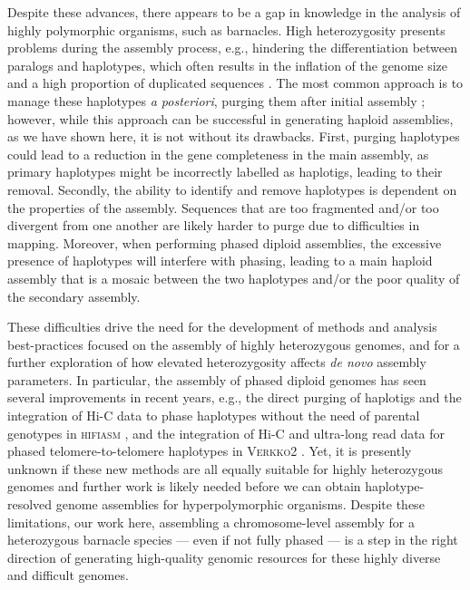 \documentclass[11pt]{article}
\begin{document}
Despite these advances, there appears to be a gap in knowledge in the analysis of
highly polymorphic organisms, such as barnacles. High heterozygosity presents
problems during the assembly process, e.g., hindering the differentiation between
paralogs and haplotypes, which often results in the inflation of the genome size and
a high proportion of duplicated sequences \citep{guiglielmoni_phasing_2024,
asalone_regional_2020,roach_purge_2018,mochizuki_practical_2023}. The most common
approach is to manage these haplotypes \textit{a posteriori}, purging them after
initial assembly \citep{guan_identifying_2020,roach_purge_2018}; however, while this
approach can be successful in generating haploid assemblies, as we have shown here,
it is not without its drawbacks. First, purging haplotypes could lead to a reduction
in the gene completeness in the main assembly, as primary haplotypes might be
incorrectly labelled as haplotigs, leading to their removal. Secondly, the ability
to identify and remove haplotypes is dependent on the properties of the assembly.
Sequences that are too fragmented and/or too divergent from one another are likely
harder to purge due to difficulties in mapping. Moreover, when performing phased
diploid assemblies, the excessive presence of haplotypes will interfere with
phasing, leading to a main haploid assembly that is a mosaic between the two
haplotypes and/or the poor quality of the secondary assembly.
\vspace{0.2cm}

These difficulties drive the need for the development of methods and analysis
best-practices focused on the assembly of highly heterozygous genomes, and for a
further exploration of how elevated heterozygosity affects \textit{de novo} assembly
parameters.
In particular, the assembly of phased diploid genomes has seen several improvements
in recent years, e.g.,
the direct purging of haplotigs and the integration of Hi-C data to phase haplotypes
without the need of parental genotypes in \textsc{hifiasm}
\citep{cheng_haplotype-resolved_2022},
and the integration of Hi-C and ultra-long read data for phased telomere-to-telomere
haplotypes in \textsc{Verkko2} \citep{antipov_verkko2_2025}.
Yet, it is presently unknown if these new methods are all equally suitable for highly
heterozygous genomes and further work is likely needed before we can obtain
haplotype-resolved genome assemblies for hyperpolymorphic organisms.
Despite these limitations, our work here, assembling a chromosome-level assembly for
a heterozygous barnacle species --- even if not fully phased --- is a step in the
right direction of generating high-quality genomic resources for these
highly diverse and difficult genomes.
\end{document}
